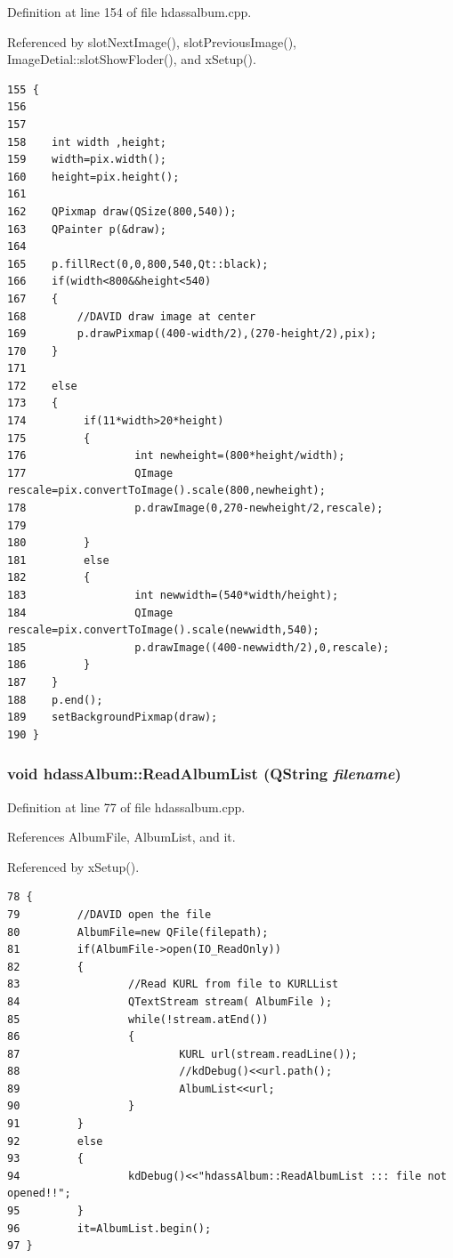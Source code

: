 Definition at line 154 of file hdassalbum.cpp.

Referenced by slot\-Next\-Image(), slot\-Previous\-Image(), Image\-Detial::slot\-Show\-Floder(), and x\-Setup().



\footnotesize\begin{verbatim}155 {
156    
157    
158    int width ,height;
159    width=pix.width();
160    height=pix.height();
161    
162    QPixmap draw(QSize(800,540));
163    QPainter p(&draw);
164 
165    p.fillRect(0,0,800,540,Qt::black);
166    if(width<800&&height<540)
167    {
168        //DAVID draw image at center
169        p.drawPixmap((400-width/2),(270-height/2),pix);
170    }
171 
172    else
173    {
174         if(11*width>20*height)
175         {
176                 int newheight=(800*height/width);
177                 QImage rescale=pix.convertToImage().scale(800,newheight);
178                 p.drawImage(0,270-newheight/2,rescale);
179                 
180         } 
181         else
182         {
183                 int newwidth=(540*width/height);
184                 QImage rescale=pix.convertToImage().scale(newwidth,540);
185                 p.drawImage((400-newwidth/2),0,rescale);
186         }
187    }    
188    p.end();
189    setBackgroundPixmap(draw);
190 }
\end{verbatim}\normalsize 
{}
\subsubsection{\setlength{\rightskip}{0pt plus 5cm}void hdass\-Album::Read\-Album\-List (QString {\em filename})\hspace{0.3cm}{\tt  [private]}}\label{classhdassAlbum_hdassAlbumd0}




Definition at line 77 of file hdassalbum.cpp.

References Album\-File, Album\-List, and it.

Referenced by x\-Setup().



\footnotesize\begin{verbatim}78 {
79         //DAVID open the file
80         AlbumFile=new QFile(filepath);
81         if(AlbumFile->open(IO_ReadOnly))
82         {
83                 //Read KURL from file to KURLList
84                 QTextStream stream( AlbumFile );
85                 while(!stream.atEnd())
86                 {
87                         KURL url(stream.readLine());
88                         //kdDebug()<<url.path();
89                         AlbumList<<url;
90                 }
91         }
92         else
93         {
94                 kdDebug()<<"hdassAlbum::ReadAlbumList ::: file not opened!!";
95         }
96         it=AlbumList.begin();
97 }
\end{verbatim}\normalsize 
{}
